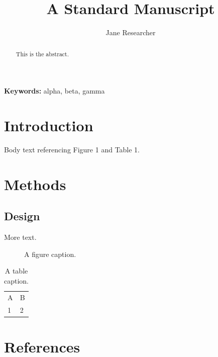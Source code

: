 \documentclass{article}
\title{A Standard Manuscript}
\author{Jane Researcher}
\begin{document}
\maketitle
\begin{abstract}
This is the abstract.
\end{abstract}
\textbf{Keywords:} alpha, beta, gamma

\section{Introduction}
Body text referencing Figure 1 and Table 1.

\section{Methods}
\subsection{Design}
More text.

\begin{figure}
\caption{A figure caption.}
\end{figure}

\begin{table}
\caption{A table caption.}
\begin{tabular}{ll}
A & B \\
1 & 2 \\
\end{tabular}
\end{table}

\section*{References}
\end{document}
